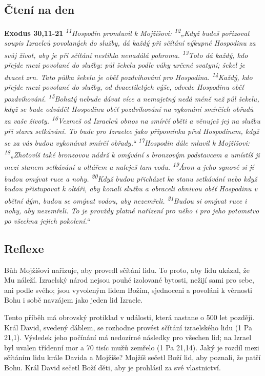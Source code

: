 \documentclass[11pt]{article}
\begin{document}
\subsection*{Čtení na den}
\textbf{Exodus 30,11-21}
\newline
\textit{
\textsuperscript{11}Hospodin promluvil k Mojžíšovi:
\textsuperscript{12}„Když budeš pořizovat soupis Izraelců povolaných do služby, dá každý při sčítání výkupné Hospodinu za svůj život, aby je při sčítání nestihla nenadálá pohroma.
\textsuperscript{13}Toto dá každý, kdo přejde mezi povolané do služby: půl šekelu podle váhy určené svatyní; šekel je dvacet zrn. Tato půlka šekelu je oběť pozdvihování pro Hospodina.
\textsuperscript{14}Každý, kdo přejde mezi povolané do služby, od dvacetiletých výše, odvede Hospodinu oběť pozdvihování.
\textsuperscript{15}Bohatý nebude dávat více a nemajetný nedá méně než půl šekelu, když se bude odvádět Hospodinu oběť pozdvihování na vykonání smírčích obřadů za vaše životy.
\textsuperscript{16}Vezmeš od Izraelců obnos na smírčí oběti a věnuješ jej na službu při stanu setkávání. To bude pro Izraelce jako připomínka před Hospodinem, když se za vás budou vykonávat smírčí obřady.“
\textsuperscript{17}Hospodin dále mluvil k Mojžíšovi:
\textsuperscript{18}„Zhotovíš také bronzovou nádrž k omývání s bronzovým podstavcem a umístíš ji mezi stanem setkávání a oltářem a naleješ tam vodu.
\textsuperscript{19}Áron a jeho synové si jí budou omývat ruce a nohy.
\textsuperscript{20}Když budou přicházet ke stanu setkávání nebo když budou přistupovat k oltáři, aby konali službu a obraceli ohnivou oběť Hospodinu v obětní dým, budou se omývat vodou, aby nezemřeli.
\textsuperscript{21}Budou si omývat ruce i nohy, aby nezemřeli. To je provždy platné nařízení pro něho i pro jeho potomstvo po všechna jejich pokolení.“
}

\subsection*{Reflexe}
Bůh Mojžíšovi nařizuje, aby provedl sčítání lidu. To proto, aby lidu ukázal, že Mu náleží. Izraelský národ nejsou pouhé
izolované bytosti, nežijí sami pro sebe, ani podle svého; jsou vyvoleným lidem Božím, sjednoceni a povoláni
k věrnosti Bohu i sobě navzájem jako jeden lid Izraele.

Tento příběh má obrovský protiklad v události, která nastane o 500 let později. Král David, svedený ďáblem, se
rozhodne provést sčítání izraelského lidu (1 Pa 21,1). Výsledek jeho počínání má nedozírné následky pro všechen lid;
na Izrael byl uvalen třídenní mor a 70 tisíc mužů zemřelo (1 Pa 21,14). Jaký je rozdíl mezi sčítáním lidu krále Davida a
Mojžíše? Mojžíš sečetl Boží lid, aby poznali, že patří Bohu. Král David sečetl Boží děti, aby je prohlásil za své
vlastnictví.
\end{document}

